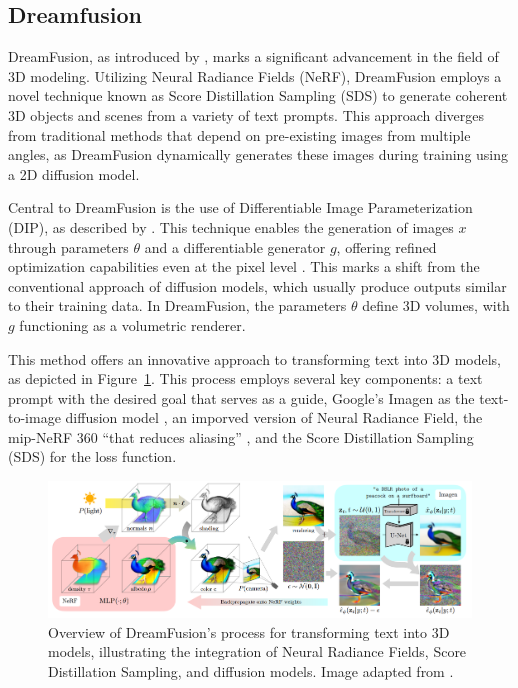 \subsection{Dreamfusion}\label{dreamfusion}

DreamFusion, as introduced by \citeauthor{pooleDreamfusion}, marks a significant advancement in the field of 3D modeling. Utilizing Neural Radiance Fields (NeRF), DreamFusion employs a novel technique known as Score Distillation Sampling (SDS) to generate coherent 3D objects and scenes from a variety of text prompts. This approach diverges from traditional methods that depend on pre-existing images from multiple angles, as DreamFusion dynamically generates these images during training using a 2D diffusion model.

Central to DreamFusion is the use of Differentiable Image Parameterization (DIP), as described by \citep{mordvintsevDIP}. This technique enables the generation of images \( x \) through parameters \( \theta \) and a differentiable generator \( g \), offering refined optimization capabilities even at the pixel level \citep{pooleDreamfusion}. This marks a shift from the conventional approach of diffusion models, which usually produce outputs similar to their training data. In DreamFusion, the parameters \( \theta \) define 3D volumes, with \( g \) functioning as a volumetric renderer. 

This method offers an innovative approach to transforming text into 3D models, as depicted in Figure~\ref{fig:figureDreamfusion}. This process employs several key components: a text prompt with the desired goal that serves as a guide, Google's Imagen as the text-to-image diffusion model \citep{saharia2022imagen}, an imporved version of Neural Radiance Field, the mip-NeRF 360 \citep{barron2022mipnerf} ``that reduces aliasing'' \citep{pooleDreamfusion}, and the Score Distillation Sampling (SDS) for the loss function.

\begin{figure}[ht]
  \centering
    \includegraphics[width=1\columnwidth]{figures/Dreamfusion.png}
    \caption{Overview of DreamFusion's process for transforming text into 3D models, illustrating the integration of Neural Radiance Fields, Score Distillation Sampling, and diffusion models. Image adapted from \citep{pooleDreamfusion}.}\label{fig:figureDreamfusion}
\end{figure}

